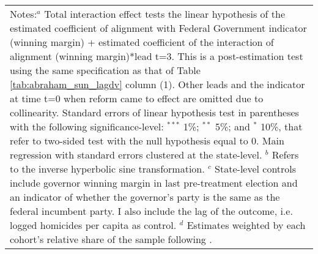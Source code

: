 \begin{table}[htbp]
{\begin{tabular}{lcccc}
\multicolumn{5}{p{1\textwidth}}{\footnotesize{Notes:$^a$ Total interaction effect tests the linear hypothesis of the estimated coefficient of alignment with Federal Government indicator (winning margin) + estimated coefficient of the interaction of alignment (winning margin)*lead t=3. This is a post-estimation test using the same specification as that of Table \ref{tab:abraham_sun_lagdv} column (1). Other leads and the indicator at time t=0 when reform came to effect are omitted due to collinearity. Standard errors of linear hypothesis test in parentheses with the following significance-level: $^{***}$ 1\%; $^{**}$ 5\%; and $^*$ 10\%, that refer to two-sided test with the null hypothesis equal to 0. Main regression with standard errors clustered at the state-level. $^b$ Refers to the inverse hyperbolic sine transformation. $^c$ State-level controls include governor winning margin in last pre-treatment election and an indicator of whether the governor's party is the same as the federal incumbent party. I also include the lag of the outcome, i.e. logged homicides per capita as control. $^d$ Estimates weighted by each cohort's relative share of the sample following \citet{abraham_sun_2020}.}} \\
\end{tabular}
}
\end{table}
